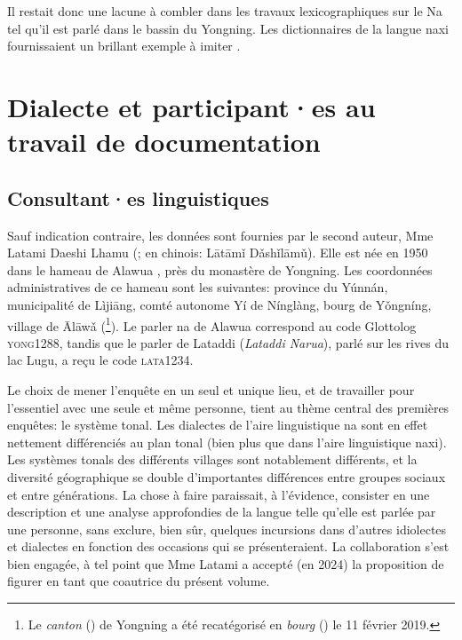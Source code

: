 Il restait donc une lacune à combler dans les travaux lexicographiques sur le Na tel qu'il est parlé dans le bassin du Yongning. Les dictionnaires de la langue naxi fournissaient un brillant exemple à imiter \parencite{heetal2011,pinsonetal2012}.


\section{Dialecte et participant·es au travail de documentation}
\label{sec:dialect}

\subsection{Consultant·es linguistiques}

Sauf indication contraire, les données sont fournies par le second auteur, Mme Latami Daeshi Lhamu (; en chinois:  Lātāmǐ Dǎshǐlāmǔ). Elle est née en 1950 dans le hameau de Alawua , près du monastère de Yongning. Les coordonnées administratives de ce hameau sont les suivantes: province du Yúnnán, municipalité de Lìjiāng, comté autonome Yí de Nínglàng, bourg de Yǒngníng, village de Ālāwǎ (\footnote{Le \emph{canton} () de Yongning a été recatégorisé en \emph{bourg} () le 11 février 2019.}). Le parler na de Alawua correspond au code Glottolog \textsc{yong1288}, tandis que le parler de Lataddi  (\emph{Lataddi Narua}), parlé sur les rives du lac Lugu, a reçu le code \textsc{lata1234}.

Le choix de mener l'enquête en un seul et unique lieu, et de travailler pour l'essentiel avec une seule et même personne, tient au thème central des premières enquêtes: le système tonal. Les dialectes de l'aire linguistique na sont en effet nettement différenciés au plan tonal (bien plus que dans l'aire linguistique naxi). Les systèmes tonals des différents villages sont notablement différents, et la diversité géographique se double d'importantes différences entre groupes sociaux et entre générations. La chose à faire paraissait, à l'évidence, consister en une description et une analyse approfondies de la langue telle qu'elle est parlée par une personne, sans exclure, bien sûr, quelques incursions dans d'autres idiolectes et dialectes en fonction des occasions qui se présenteraient. La collaboration s'est bien engagée, à tel point que Mme Latami a accepté (en 2024) la proposition de figurer en tant que coautrice du présent volume.


